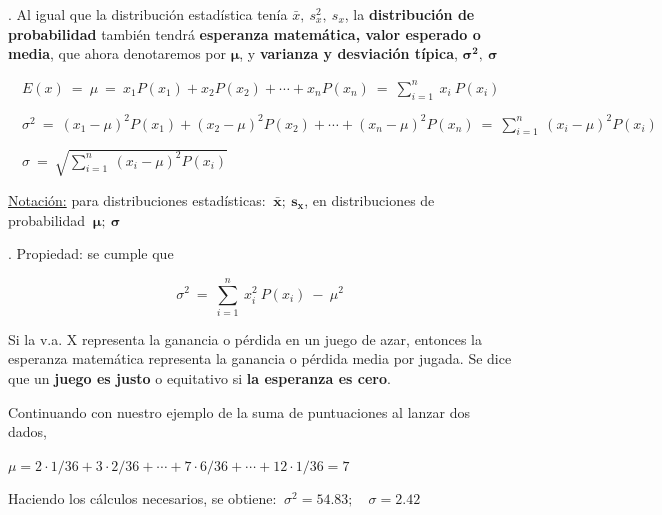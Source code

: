 \newpage %
\vspace{3mm} \begin{definition}
.	Al igual que la distribución estadística tenía $\bar x, \ s_x^2, \ s_x$, la \textbf{distribución de probabilidad} también tendrá \textbf{esperanza matemática, valor esperado o media}, que ahora denotaremos por $\boldsymbol \mu$, y \textbf{varianza y desviación típica}, $\boldsymbol{\sigma^2,\ \sigma}$

$\quad E(x)\ =\ \mu \ = \ x_1 P(x_1)+x_2 P(x_2)+ \cdots + x_n P(x_n)\ = \  \displaystyle \sum_{i=1}^n \ x_i \ P(x_i)$

$\quad  \sigma^2 \ = \  (x_1-\mu)^2 P(x_1)+ (x_2-\mu)^2 P(x_2) + \cdots + (x_n-\mu)^2 P(x_n) \ = \ \displaystyle \sum_{i=1}^n \ (x_i-\mu)^2 P(x_i) $

$\quad \sigma \ = \ \sqrt{\displaystyle \sum_{i=1}^n \ (x_i-\mu)^2 P(x_i)}$

\end{definition}

\vspace{2mm} \underline{Notación:} para distribuciones estadísticas: $\ \boldsymbol{ \bar x; \ s_x }$, en distribuciones de probabilidad $\ \boldsymbol{ \mu;\ \sigma}$

\vspace{2mm} \begin{theorem}
.	Propiedad: se cumple que

$$\sigma^2 \ =  \ 	\displaystyle \sum_{i=1}^n\ x_i^2\ P(x_i) \ - \ \mu^2$$
\end{theorem}

\begin{destacado}
	Si la v.a. X representa la ganancia o pérdida en un juego de azar, entonces la esperanza matemática representa la ganancia o pérdida media por jugada. Se dice que un \textbf{juego es justo} o equitativo si 	\textbf{la esperanza es cero}.
\end{destacado}


\begin{example}
	
Continuando con nuestro ejemplo de la suma de puntuaciones al lanzar dos dados,

\vspace{2mm} $\mu= 2\cdot 1/36 + 3 \cdot 2/36 + \cdots + 7 \cdot 6/36 + \cdots + 12\cdot 1/36= 7$

\vspace{2mm} Haciendo los cálculos necesarios, se obtiene: $\ \sigma^2=54.83;\quad \sigma=2.42$
\end{example}

